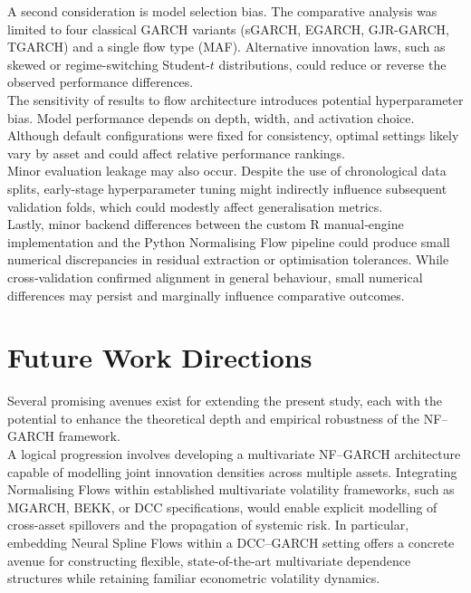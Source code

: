 \documentclass[oneside,12pt]{CUEDthesisPSnPDF}
\begin{document}
\medskip
\noindent
A second consideration is model selection bias. The comparative analysis was limited to four classical GARCH variants (sGARCH, EGARCH, GJR-GARCH, TGARCH) and a single flow type (MAF). Alternative innovation laws, such as skewed or regime-switching Student-$t$ distributions, could reduce or reverse the observed performance differences.\\

\medskip
\noindent
The sensitivity of results to flow architecture introduces potential hyperparameter bias. Model performance depends on depth, width, and activation choice. Although default configurations were fixed for consistency, optimal settings likely vary by asset and could affect relative performance rankings.\\

\medskip
\noindent
Minor evaluation leakage may also occur. Despite the use of chronological data splits, early-stage hyperparameter tuning might indirectly influence subsequent validation folds, which could modestly affect generalisation metrics.\\

\medskip
\noindent
Lastly, minor backend differences between the custom R manual‑engine implementation and the Python Normalising Flow pipeline could produce small numerical discrepancies in residual extraction or optimisation tolerances. While cross‑validation confirmed alignment in general behaviour, small numerical differences may persist and marginally influence comparative outcomes.\\


\section{Future Work Directions}
\noindent
Several promising avenues exist for extending the present study, each with the potential to enhance the theoretical depth and empirical robustness of the NF–GARCH framework.\\

\medskip
\noindent
A logical progression involves developing a multivariate NF–GARCH architecture capable of modelling joint innovation densities across multiple assets. Integrating Normalising Flows within established multivariate volatility frameworks, such as MGARCH, BEKK, or DCC specifications, would enable explicit modelling of cross-asset spillovers and the propagation of systemic risk. In particular, embedding Neural Spline Flows within a DCC–GARCH setting offers a concrete avenue for constructing flexible, state-of-the-art multivariate dependence structures while retaining familiar econometric volatility dynamics.\\
\end{document}
